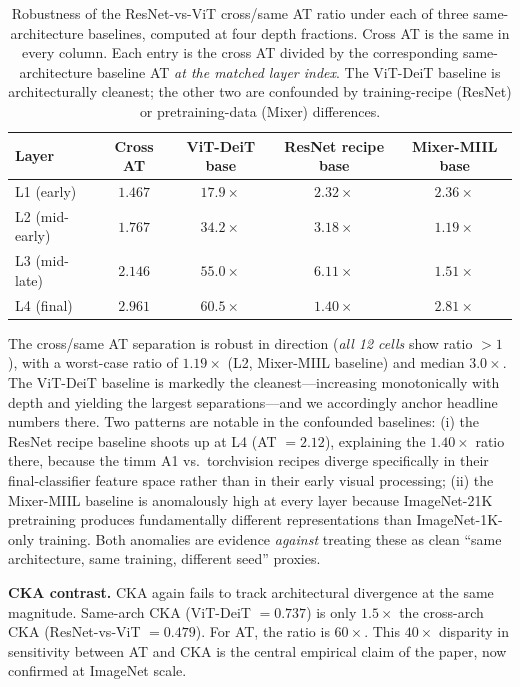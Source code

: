 \documentclass{article}
\begin{document}
\begin{table}[t]
\caption{Robustness of the ResNet-vs-ViT cross/same AT ratio under each of three same-architecture baselines, computed at four depth fractions. Cross AT is the same in every column. Each entry is the cross AT divided by the corresponding same-architecture baseline AT \emph{at the matched layer index}. The ViT-DeiT baseline is architecturally cleanest; the other two are confounded by training-recipe (ResNet) or pretraining-data (Mixer) differences.}
\label{tab:imagenet_robust}
\centering
\small
\begin{tabular}{@{}lcccc@{}}
\toprule
Layer & Cross AT & ViT-DeiT base & ResNet recipe base & Mixer-MIIL base \\
\midrule
L1 (early)         & $1.467$ & $\mathbf{17.9\times}$ & $2.32\times$ & $2.36\times$ \\
L2 (mid-early)     & $1.767$ & $\mathbf{34.2\times}$ & $3.18\times$ & $1.19\times$ \\
L3 (mid-late)      & $2.146$ & $\mathbf{55.0\times}$ & $6.11\times$ & $1.51\times$ \\
L4 (final)         & $2.961$ & $\mathbf{60.5\times}$ & $1.40\times$ & $2.81\times$ \\
\bottomrule
\end{tabular}
\end{table}

The cross/same AT separation is robust in direction (\emph{all 12 cells} show ratio $> 1$), with a worst-case ratio of $1.19\times$ (L2, Mixer-MIIL baseline) and median $3.0\times$. The ViT-DeiT baseline is markedly the cleanest---increasing monotonically with depth and yielding the largest separations---and we accordingly anchor headline numbers there. Two patterns are notable in the confounded baselines: (i) the ResNet recipe baseline shoots up at L4 (AT $= 2.12$), explaining the $1.40\times$ ratio there, because the timm A1 vs.\ torchvision recipes diverge specifically in their final-classifier feature space rather than in their early visual processing; (ii) the Mixer-MIIL baseline is anomalously high at every layer because ImageNet-21K pretraining produces fundamentally different representations than ImageNet-1K-only training. Both anomalies are evidence \emph{against} treating these as clean ``same architecture, same training, different seed'' proxies.

\textbf{CKA contrast.} CKA again fails to track architectural divergence at the same magnitude. Same-arch CKA (ViT-DeiT $= 0.737$) is only $1.5\times$ the cross-arch CKA (ResNet-vs-ViT $= 0.479$). For AT, the ratio is $60\times$. This $40\times$ disparity in sensitivity between AT and CKA is the central empirical claim of the paper, now confirmed at ImageNet scale.
\end{document}
